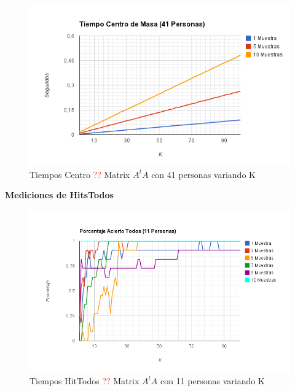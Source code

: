 \begin{figure}[H]
\includegraphics[width=1\textwidth]{img/image9.png}
     \caption{Tiempos Centro \textcolor{red}{??} Matrix $A^tA$ con 41 personas variando K}
     \label{fig:figura1}
\end{figure}



\textbf{Mediciones de HitsTodos }

\begin{figure}[H]
\includegraphics[width=1\textwidth]{img/image10.png}
     \caption{Tiempos HitTodos \textcolor{red}{??} Matrix $A^tA$ con 11 personas variando K}
     \label{fig:figura1}
\end{figure}

